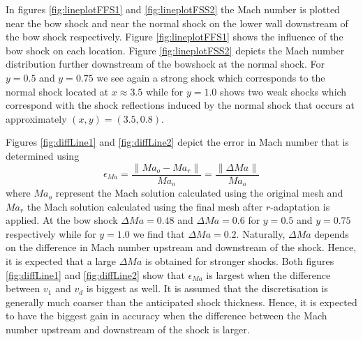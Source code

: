 \documentclass[review]{elsarticle}
\begin{document}
In figures \ref{fig:lineplotFFS1} and \ref{fig:lineplotFSS2} the Mach number is plotted near the bow shock and near the normal shock on the lower wall downstream of the bow shock respectively. 
Figure \ref{fig:lineplotFFS1} shows the influence of the bow shock on each location.
Figure \ref{fig:lineplotFSS2} depicts the Mach number distribution further downstream of the bowshock at the normal shock. For $y=0.5$ and $y=0.75$ we see again a strong shock which corresponds to the normal shock located at $x\approx3.5$ while for $y=1.0$ shows two weak shocks which correspond with the shock reflections induced by the normal shock that occurs at approximately $(x,y) = (3.5,0.8)$. 
\par Figures \ref{fig:diffLine1} and \ref{fig:diffLine2} depict the error in Mach number  that is determined using
\begin{equation}
\epsilon_{Ma} =  \frac{\| Ma_o - Ma_r\|}{Ma_o}=\frac{\| \Delta Ma\|}{Ma_o}
\end{equation} 
where $Ma_o$ represent the Mach solution calculated using the original mesh and $Ma_r$ the Mach solution calculated using the final mesh after $r$-adaptation is applied.
At the bow shock $\Delta Ma = 0.48$ and $\Delta Ma = 0.6$ for $y=0.5$ and $y=0.75$ respectively while for $y=1.0$ we find that $\Delta Ma = 0.2$.
Naturally, $\Delta Ma$ depends on the difference in Mach number upstream and downstream of the shock.
Hence, it is expected that a large $\Delta Ma$ is obtained for stronger shocks. 
Both figures \ref{fig:diffLine1} and \ref{fig:diffLine2} show that $\epsilon_{Ma}$ is largest when the difference between $v_1$ and $v_d$ is biggest as well. It is assumed that the discretisation is generally much coarser than the anticipated shock thickness. 
Hence, it is expected to have the biggest gain in accuracy when the difference between the Mach number upstream and downstream of the shock is larger.
\end{document}

